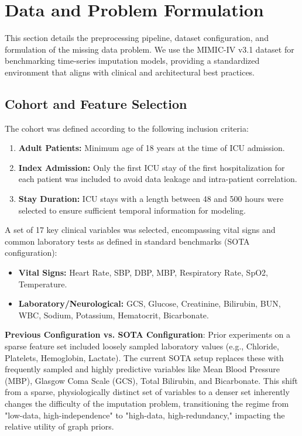 \section{Data and Problem Formulation}

This section details the preprocessing pipeline, dataset configuration, and formulation of the missing data problem. We use the MIMIC-IV v3.1 dataset for benchmarking time-series imputation models, providing a standardized environment that aligns with clinical and architectural best practices.

\subsection{Cohort and Feature Selection}
The cohort was defined according to the following inclusion criteria:
\begin{enumerate}
    \item \textbf{Adult Patients:} Minimum age of 18 years at the time of ICU admission.
    \item \textbf{Index Admission:} Only the first ICU stay of the first hospitalization for each patient was included to avoid data leakage and intra-patient correlation.
    \item \textbf{Stay Duration:} ICU stays with a length between 48 and 500 hours were selected to ensure sufficient temporal information for modeling.
\end{enumerate}

A set of 17 key clinical variables was selected, encompassing vital signs and common laboratory tests as defined in standard benchmarks (SOTA configuration):
\begin{itemize}
    \item \textbf{Vital Signs:} Heart Rate, SBP, DBP, MBP, Respiratory Rate, SpO2, Temperature.
    \item \textbf{Laboratory/Neurological:} GCS, Glucose, Creatinine, Bilirubin, BUN, WBC, Sodium, Potassium, Hematocrit, Bicarbonate.
\end{itemize}

\textbf{Previous Configuration vs. SOTA Configuration}: Prior experiments on a sparse feature set included loosely sampled laboratory values (e.g., Chloride, Platelets, Hemoglobin, Lactate). The current SOTA setup replaces these with frequently sampled and highly predictive variables like Mean Blood Pressure (MBP), Glasgow Coma Scale (GCS), Total Bilirubin, and Bicarbonate. This shift from a sparse, physiologically distinct set of variables to a denser set inherently changes the difficulty of the imputation problem, transitioning the regime from "low-data, high-independence" to "high-data, high-redundancy," impacting the relative utility of graph priors.

